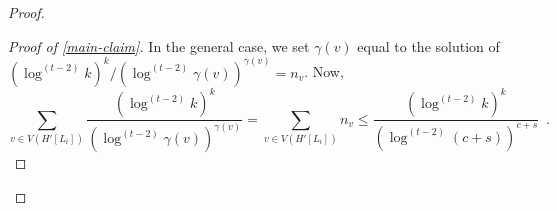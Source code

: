 \documentclass[kpfonts]{patmorin}
\theoremstyle{named}
\begin{document}
\begin{proof}
\begin{proof}[Proof of \cref{main-claim}]
        In the general case, we set $\gamma(v)$ equal to the solution of $(\log^{(t-2)} k)^k/(\log^{(t-2)} \gamma(v))^{\gamma(v)} = n_v$. Now,
        \[ \sum_{v\in V(H'[L_i])}\frac{(\log^{(t-2)} k)^k}{(\log^{(t-2)} \gamma(v))^{\gamma(v)}} = \sum_{v\in V(H'[L_i])} n_v \le \frac{(\log^{(t-2)} k)^k}{(\log^{(t-2)} (c+s))^{c+s}} \enspace .
        \]

\end{proof}
\end{proof}
\end{document}
